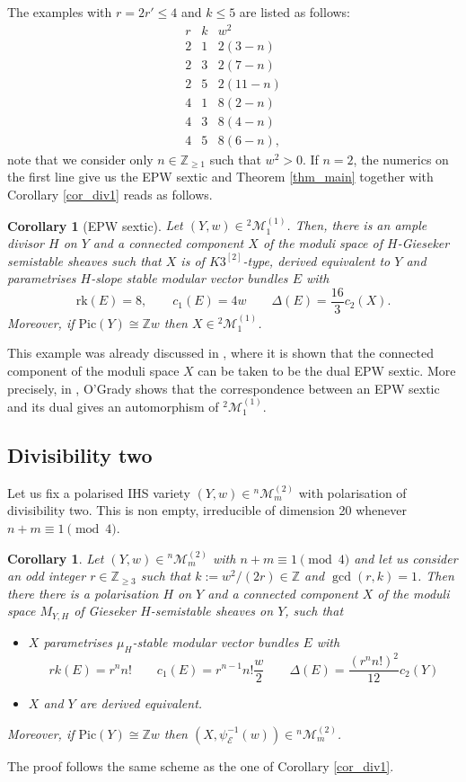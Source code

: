 \documentclass[12pt,a4paper]{amsart}
\theoremstyle{plain}
\newtheorem{cor}[thm]{Corollary}
\theoremstyle{definition}
\theoremstyle{remark}
\def\Pic{\mathrm{Pic}}
\def\Z{\mathbb{Z}}
\newcommand{\kE}{\mathcal{E}}
\newcommand{\ZZ}{\mathbb{Z}}
\newcommand{\rk}{\mathrm{rk}}
\newcommand{\rathodge}[1]{\psi_{#1}}
\newcommand{\cc}{c}
\begin{document}
The examples with $r=2r'\leq 4$ and $k\leq 5$ are listed as follows: 
$$\begin{array}{cc|c}
        r&k&w^2\\
        \hline
        2&1&2(3-n)\\
        2&3&2(7-n)\\
        2&5&2(11-n)\\
        4&1&8(2-n)\\
        4&3&8(4-n)\\
        4&5&8(6-n),
    \end{array}$$
note that we consider only $n\in \ZZ_{\geq 1}$ such that $w^2>0$.
If $n=2$, the numerics on the first line give us the EPW sextic and Theorem \ref{thm_main} together with Corollary \ref{cor_div1} reads as follows.
\begin{cor}[EPW sextic]\label{cor_EPWsextic}
    Let $(Y,w)\in {}^{2}\mathcal{M}_{1}^{(1)}$.
    Then, there is an ample divisor $H$ on $Y$ and a connected component $X$ of the moduli space of $H$-Gieseker semistable sheaves such that $X$ is of $K3^{[2]}$-type, derived equivalent to $Y$ and parametrises $H$-slope stable modular vector bundles $E$ with
    \[
    \rk(E)=8, \qquad c_1(E)=4w \qquad \Delta(E)=\frac{16}{3}\cc_2(X).
    \]
    Moreover, if $\Pic(Y)\cong \Z w$ then $X\in {}^{2}\mathcal{M}_{1}^{(1)}$.
\end{cor}
This example was already discussed in \cite[Proposition 5.2]{kapustka-kapustka-derived-equivalent-hk4}, where it is shown that the connected component of the moduli space $X$ can be taken to be the dual EPW sextic.
More precisely, in \cite[Section 4.2]{OG15}, O'Grady shows that the correspondence between an EPW sextic and its dual gives an automorphism of ${}^{2}\mathcal{M}_{1}^{(1)}$.


\subsection{Divisibility two}
Let us fix a polarised IHS variety $(Y,w)\in {}^{n}\mathcal{M}_{m}^{(2)}$ with polarisation of divisibility two. 
This is non empty, irreducible of dimension 20 whenever $n+m\equiv 1\pmod{4}$.

\begin{cor}\label{cor_div2}
    Let $(Y,w)\in {}^{n}\mathcal{M}_{m}^{(2)}$ with $n+m\equiv 1\pmod{4}$ and let us consider an odd integer $r\in \ZZ_{\geq 3}$ such that $k:=w^2/(2r)\in \ZZ$ and $\gcd(r,k)=1$.
    Then there there is a polarisation $H$ on $Y$ and a connected component $X$ of the moduli space $M_{Y,H}$ of Gieseker $H$-semistable sheaves on $Y$, such that
     \begin{itemize}
        \item $X$ parametrises $\mu_H$-stable modular vector bundles $E$ with 
        \[rk(E)=r^nn! \qquad c_1(E)=r^{n-1}n!\dfrac{w}{2} \qquad \Delta(E)=\frac{(r^n n!)^2}{12}\cc_2(Y)\]
        \item $X$ and $Y$ are derived equivalent.
    \end{itemize}
    Moreover, if $\Pic(Y)\cong \Z w$ then $(X,\rathodge{\kE}^{-1}(w))\in {}^{n}\mathcal{M}_{m}^{(2)}$.
\end{cor}
The proof follows the same scheme as the one of Corollary \ref{cor_div1}.
\end{document}
